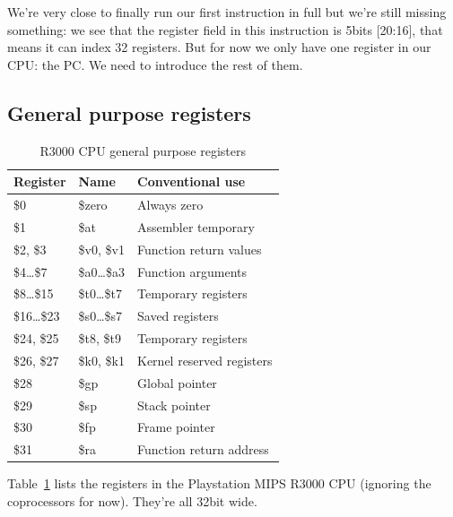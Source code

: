 \documentclass[a4paper]{article}
\begin{document}
We're very close to finally run our first instruction in full but
we're still missing something: we see that the register field in this
instruction is 5bits [20:16], that means it can index 32 registers. But for
now we only have one register in our CPU: the PC. We need to
introduce the rest of them.

\subsection{General purpose registers}

\begin{table}[ht]
  \centering

  \begin{tabular}{ l | l | l }
    Register         & Name             & Conventional use          \\
    \hline
    \$0              & \$zero           & Always zero               \\
    \$1              & \$at             & Assembler temporary       \\
    \$2, \$3         & \$v0, \$v1       & Function return values    \\
    \$4\dots{}\$7    & \$a0\dots{}\$a3  & Function arguments        \\
    \$8\dots{}\$15   & \$t0\dots{}\$t7  & Temporary registers       \\
    \$16\dots{}\$23  & \$s0\dots{}\$s7  & Saved registers           \\
    \$24, \$25       & \$t8, \$t9       & Temporary registers       \\
    \$26, \$27       & \$k0, \$k1       & Kernel reserved registers \\
    \$28             & \$gp             & Global pointer            \\
    \$29             & \$sp             & Stack pointer             \\
    \$30             & \$fp             & Frame pointer             \\
    \$31             & \$ra             & Function return address   \\
  \end{tabular}

  \caption{R3000 CPU general purpose registers}
  \label{tab:cpuregs}
\end{table}

Table~\ref{tab:cpuregs} lists the registers in the Playstation MIPS
R3000 CPU (ignoring the coprocessors for now). They're all 32bit
wide.
\end{document}
